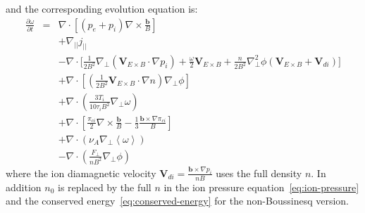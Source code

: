 \documentclass[12pt,a4paper]{article}
\begin{document}
and the corresponding evolution equation is:
\begin{subequations}
\begin{eqnarray}
%
%
  \frac{\partial\omega}{\partial t} &=& \nabla\cdot\left[\left(p_e + p_i\right)\nabla\times\frac{\mathbf{b}}{B}\right] \label{eq:vort-nB_diamag} \\
  && + \nabla_{||}j_{||} \label{eq:vort-nB_jpar} \\
  && - \nabla\cdot\Big[ \frac{1}{2B^2}\nabla_\perp\left(\mathbf{V}_{E\times B}\cdot\nabla p_i\right) + \frac{\omega}{2}\mathbf{V}_{E\times B}  +\frac{n}{2B^2}\nabla_\perp^2\phi \left(\mathbf{V}_{E\times B} + \mathbf{V}_{di}\right) \Big] \label{eq:vort-nB_c} \\
  && + \nabla\cdot\left[\left(\frac{1}{2B^2}\mathbf{V}_{E\times B}\cdot\nabla n\right)\nabla_\perp\phi\right] \\
  && + \nabla\cdot\left(\frac{3T_i}{10\tau_iB^2}\nabla_\perp\omega\right) \label{eq:vort-nB_perpvis} \\
  && + \nabla\cdot\left[\frac{\pi_{ci}}{2}\nabla\times\frac{\mathbf{b}}{B} - \frac{1}{3}\frac{\mathbf{b}\times\nabla\pi_{ci}}{B}\right] \\
  && + \nabla\cdot\left(\nu_A\nabla_\perp\left<\omega\right>\right) \\
  && - \nabla\cdot\left(\frac{F_\perp}{nB^2}\nabla_\perp\phi\right)
\end{eqnarray}
\end{subequations}
where the ion diamagnetic velocity $\mathbf{V}_{di} = \frac{\mathbf{b}\times\nabla p_i}{n B}$ uses the full density $n$.
In addition $n_0$ is replaced by the full $n$ in the ion pressure equation~\ref{eq:ion-pressure} and the conserved energy~\ref{eq:conserved-energy} for the non-Boussinesq version.
\end{document}
